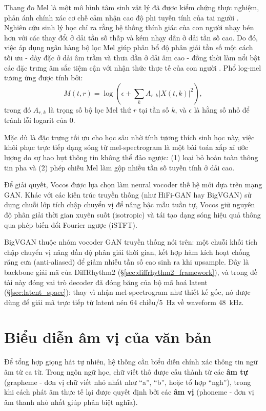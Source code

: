 \documentclass[a4paper,13pt,oneside]{report}
\begin{document}
Thang đo Mel là một mô hình tâm sinh vật lý đã được kiểm chứng thực nghiệm, phản ánh chính xác cơ chế cảm nhận cao độ phi tuyến tính của tai người \cite{mel}. Nghiên cứu sinh lý học chỉ ra rằng hệ thống thính giác của con người nhạy bén hơn với các thay đổi ở dải tần số thấp và kém nhạy dần ở dải tần số cao. Do đó, việc áp dụng ngân hàng bộ lọc Mel giúp phân bổ độ phân giải tần số một cách tối ưu - dày đặc ở dải âm trầm và thưa dần ở dải âm cao - đồng thời làm nổi bật các đặc trưng âm sắc tiệm cận với nhận thức thực tế của con người \cite{mfcc}. Phổ log-mel tương ứng được tính bởi:
\begin{equation}
 M(t,r)=\log\left(\epsilon+\sum_k A_{r,k}|X(t,k)|^2\right),
\end{equation}
trong đó $A_{r,k}$ là trọng số bộ lọc Mel thứ $r$ tại tần số $k$, và $\epsilon$ là hằng số nhỏ để tránh lỗi logarit của $0$.

Mặc dù là đặc trưng tối ưu cho học sâu nhờ tính tương thích sinh học này, việc khôi phục trực tiếp dạng sóng từ mel-spectrogram là một bài toán xấp xỉ ước lượng do sự hao hụt thông tin không thể đảo ngược: (1) loại bỏ hoàn toàn thông tin pha và (2) phép chiếu Mel làm gộp nhiều tần số tuyến tính ở dải cao. 

Để giải quyết, Vocos \cite{vocos} được lựa chọn làm neural vocoder thế hệ mới dựa trên mạng GAN. Khác với các kiến trúc truyền thống (như HiFi-GAN hay BigVGAN) sử dụng chuỗi lớp tích chập chuyển vị để nâng bậc mẫu tuần tự, Vocos giữ nguyên độ phân giải thời gian xuyên suốt (isotropic) và tái tạo dạng sóng hiệu quả thông qua phép biến đổi Fourier ngược (iSTFT).

BigVGAN \cite{bigvgan} thuộc nhóm vocoder GAN truyền thống nói trên: một chuỗi khối tích chập chuyển vị nâng dần độ phân giải thời gian, kết hợp hàm kích hoạt chống răng cưa (anti-aliased) để giảm nhiễu tần số cao sinh ra khi upsample. Đây là backbone giải mã của DiffRhythm2 (\S\ref{sec:diffrhythm2_framework}), và trong đề tài này đóng vai trò decoder đã đóng băng của bộ mã hoá latent (\S\ref{sec:latent_space}): thay vì nhận mel-spectrogram như thiết kế gốc, nó được dùng để giải mã trực tiếp từ latent nén 64 chiều/5~Hz về waveform 48~kHz.

\section{Biểu diễn âm vị của văn bản}
\label{sec:bieu-dien-loi-ca-xphonebert}

Để tổng hợp giọng hát tự nhiên, hệ thống cần biểu diễn chính xác thông tin ngữ âm từ ca từ. Trong ngôn ngữ học, chữ viết thô được cấu thành từ các \textbf{âm tự} (grapheme - đơn vị chữ viết nhỏ nhất như ``a'', ``b'', hoặc tổ hợp ``ngh''), trong khi cách phát âm thực tế lại được quyết định bởi các \textbf{âm vị} (phoneme - đơn vị âm thanh nhỏ nhất giúp phân biệt nghĩa). 
\end{document}
